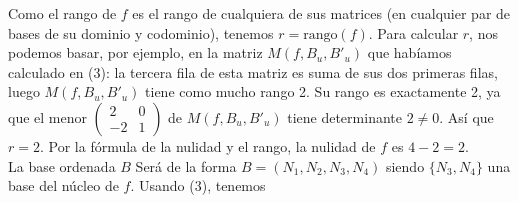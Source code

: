 \documentclass[12pt]{article}
\begin{document}
\begin{ejercicio}[2.5 puntos]
\begin{enumerate}
			Como el rango de $f$ es el rango de cualquiera de sus matrices (en cualquier par de bases de su dominio y codominio), tenemos $r = \text{rango}(f)$. Para calcular $r$, nos podemos basar, por ejemplo, en la matriz $M(f, B_u, B'_u)$ que habíamos calculado en (3): la tercera fila de esta matriz es suma de sus dos primeras filas, luego $M(f, B_u, B'_u)$ tiene como mucho rango 2. Su rango es exactamente 2, ya que el menor $\displaystyle \begin{pmatrix}
				2 & 0 \\ 
				-2 & 1
			\end{pmatrix}$ de $M(f, B_u, B'_u)$ tiene determinante $2 \ne 0$. Así que $r=2$. Por la fórmula de la nulidad y el rango, la nulidad de $f$ es $4-2=2$.\\
			La base ordenada $B$ Será de la forma $B = (N_1, N_2, N_3, N_4)$ siendo $\{N_3, N_4\}$ una base del núcleo de $f$. Usando (3), tenemos
			

\end{enumerate}
\end{ejercicio}
\end{document}
